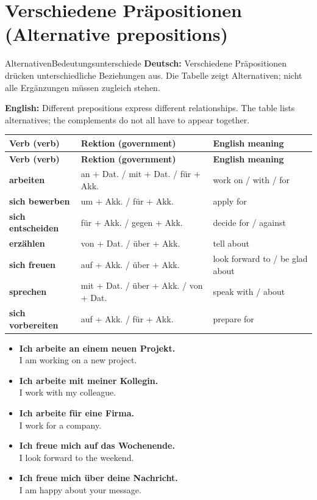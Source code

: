 \documentclass[a4paper,11pt]{article}
\newcommand{\GermanText}[1]{\textbf{Deutsch: }#1\par}
\newcommand{\EnglishText}[1]{{\small\color{SoftGray}\textbf{English: }#1\par}}
\newcommand{\ExampleItem}[2]{\item \textbf{#1}\\{\small\color{SoftGray}#2}}
\begin{document}
\section{Verschiedene Präpositionen (Alternative prepositions)}
\begin{grammarentry}{Alternativen}{Bedeutungsunterschiede}
\GermanText{Verschiedene Präpositionen drücken unterschiedliche Beziehungen aus. Die Tabelle zeigt Alternativen; nicht alle Ergänzungen müssen zugleich stehen.}
\EnglishText{Different prepositions express different relationships. The table lists alternatives; the complements do not all have to appear together.}
\end{grammarentry}
\begin{longtable}{>{\raggedright\arraybackslash}p{} >{\raggedright\arraybackslash}p{} >{\raggedright\arraybackslash}p{}}
\rowcolor{HeaderBlueDark}
\color{white}\textbf{Verb (verb)} & \color{white}\textbf{Rektion (government)} & \color{white}\textbf{English meaning}\\
\endfirsthead
\rowcolor{HeaderBlueDark}
\color{white}\textbf{Verb (verb)} & \color{white}\textbf{Rektion (government)} & \color{white}\textbf{English meaning}\\
\endhead
\textbf{arbeiten} & an + Dat. / mit + Dat. / für + Akk. & work on / with / for\\
\textbf{sich bewerben} & um + Akk. / für + Akk. & apply for\\
\textbf{sich entscheiden} & für + Akk. / gegen + Akk. & decide for / against\\
\textbf{erzählen} & von + Dat. / über + Akk. & tell about\\
\textbf{sich freuen} & auf + Akk. / über + Akk. & look forward to / be glad about\\
\textbf{sprechen} & mit + Dat. / über + Akk. / von + Dat. & speak with / about\\
\textbf{sich vorbereiten} & auf + Akk. / für + Akk. & prepare for\\
\end{longtable}
\begin{exbox}
\begin{itemize}
\ExampleItem{Ich arbeite an einem neuen Projekt.}{I am working on a new project.}
\ExampleItem{Ich arbeite mit meiner Kollegin.}{I work with my colleague.}
\ExampleItem{Ich arbeite für eine Firma.}{I work for a company.}
\ExampleItem{Ich freue mich auf das Wochenende.}{I look forward to the weekend.}
\ExampleItem{Ich freue mich über deine Nachricht.}{I am happy about your message.}
\end{itemize}
\end{exbox}
\end{document}
